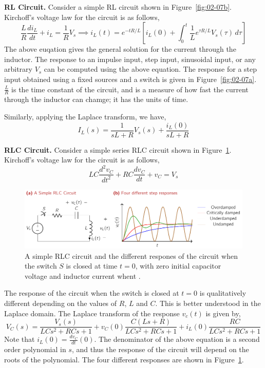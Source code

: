 \noindent\textbf{RL Circuit.} Consider a simple RL circuit shown in Figure~\ref{fig:02-07b}. Kirchoff's voltage law for the circuit is as follows,
\begin{equation}
    \frac{L}{R} \frac{di_L}{dt} + i_L = \frac{1}{R}V_s \implies i_L(t) = e^{-tR/L} \left[ i_{L}(0) + \int_0^t \frac{1}{L} e^{\tau R/L} V_s(\tau)\, d\tau \right]
    \label{eq:02-30}
\end{equation}
The above euqation gives the general solution for the current through the inductor. The response to an impulse input, step input, sinusoidal input, or any arbitrary $V_s$ can be computed using the above equation. The response for a step input obtained using a fixed sources and a switch is given in Figure~\ref{fig:02-07a}. $\frac{L}{R}$ is the time constant of the circuit, and is a measure of how fast the current through the inductor can chamge; it has the units of time.

Similarly, applying the Laplace transform, we have,
\begin{equation}
    I_L(s) = \frac{1}{sL + R} V_s(s) + \frac{i_L(0)}{sL + R}
    \label{eq:02-31}
\end{equation}

\noindent\textbf{RLC Circuit.} Consider a simple series RLC circuit shown in Figure~\ref{fig:02-08}. Kirchoff's voltage law for the circuit is as follows,
\begin{equation}
    LC\frac{d^2 v_C}{dt^2} + RC \frac{d v_C}{dt} + v_C = V_s 
    \label{eq:02-32}
\end{equation}
\begin{figure}[t]
    \centering
    \includegraphics[width=\textwidth]{figure/ch02/fig02-08.pdf}
    \caption{A simple RLC circuit and the different respones of the circuit when the switch $S$ is closed at time $t = 0$, with  zero initial capacitor voltage and inductor current whent .}
    \label{fig:02-08}
\end{figure}
The response of the circuit when the switch is closed at $t=0$ is qualitatively different depending on the values of $R$, $L$ and $C$. This is better understood in the Laplace domain. The Laplace transform of the response $v_c(t)$ is given by,
\begin{equation}
    V_C(s) = \frac{V_s(s)}{LCs^2 + RCs + 1} + v_C(0)\frac{C\left(Ls + R\right)}{LCs^2 + RCs + 1} + i_L(0)\frac{RC}{LCs^2 + RCs + 1}
    \label{eq:02-33}
\end{equation}
Note that $i_L(0) = \frac{d v_C}{dt}(0)$. The denominator of the above equation is a second order polynomial in $s$, and thus the response of the circuit will depend on the roots of the polynomial. The four different responses are shown in Figure~\ref{fig:02-08}.

